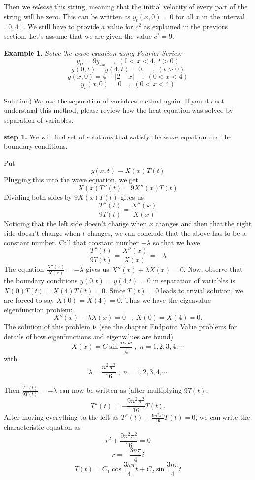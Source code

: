 \documentclass[12pt]{report}
\newtheorem{ex}{Example}[section]
\begin{document}
Then we \textit{release} this string, meaning that the initial velocity of every part of the string will be zero. This can be written as $ y_t (x,0) = 0 $ for all $x$ in the interval $[0,4]$. We still have to provide a value for $c^2$ as explained in the previous section. Let's assume that we are given the value $c^2=9$. 

\begin{ex}
	Solve the wave equation using Fourier Series:
	$$ y_{tt} = 9 y_{xx} \; \; \; \;,  \; (0<x<4, \; t>0) $$
	$$ y(0,t) = y(4,t)=0, \; \; \; \;,  \; ( t>0) $$
	$$ y(x,0) = 4 - |2-x| \; \; \; \;,  \; (0<x<4) $$
	$$ y_t (x,0) = 0 \; \; \; \;,  \; (0<x<4) $$
	\end{ex}

Solution) 
We use the separation of variables method again. If you do not understand this method, please review how the heat equation was solved by separation of variables. 

\textbf{step 1.} We will find set of solutions that satisfy the wave equation and the boundary conditions.

Put
$$y(x,t) = X(x) T(t) $$
Plugging this into the wave equation, we get
$$ X(x) T''(t) = 9 X''(x) T(t) $$
Dividing both sides by $ 9 X(x) T(t) $ gives us
$$\frac{T''(t)}{9T(t)}= \frac{X''(x)}{X(x)}$$
Noticing that the left side doesn't change when $x$ changes and then that the right side doesn't change when $t$ changes, we can conclude that the above has to be a constant number. Call that constant number $-\lambda$ so that we have
$$\frac{T''(t)}{9T(t)}= \frac{X''(x)}{X(x)}=-\lambda$$
The equation $\frac{X''(x)}{X(x)}=-\lambda$ gives us 
$X''(x) + \lambda X(x) =0 $. Now, observe that the boundary conditions $ y(0,t) = y(4,t)=0$ in separation of variables is $X(0)T(t)=X(4)T(t)=0$. Since $T(t)=0$ leads to trivial solution, we are forced to say $X(0)=X(4)=0$. Thus we have the eigenvalue-eigenfunction problem:
$$ X''(x) + \lambda X(x) =0 \; \; \; , \; X(0)=X(4)=0.$$
The solution of this problem is (see the chapter Endpoint Value problems for details of how eigenfunctions and eigenvalues are found)
$$X(x)= C \sin\frac{n\pi x}{4} \;, \; n=1,2,3,4,\cdots$$
with
$$\lambda = \frac{n^2 \pi^2}{16} \;, \; n=1,2,3,4,\cdots$$

Then $\frac{T''(t)}{9T(t)}=-\lambda$ can now be written as (after multiplying $9T(t)$,
$$T''(t) = -\frac{9n^2 \pi^2}{16} T(t).$$
After moving everything to the left as $T''(t) + \frac{9n^2 \pi^2}{16} T(t)=0$, we can write the characteristic equation as
$$r^2 + \frac{9n^2 \pi^2}{16}=0$$
$$r =\pm \frac{3n\pi}{4} i$$
$$T(t) = C_1 \cos \frac{3n\pi}{4} t + C_2 \sin \frac{3n\pi}{4} t $$
\end{document}
